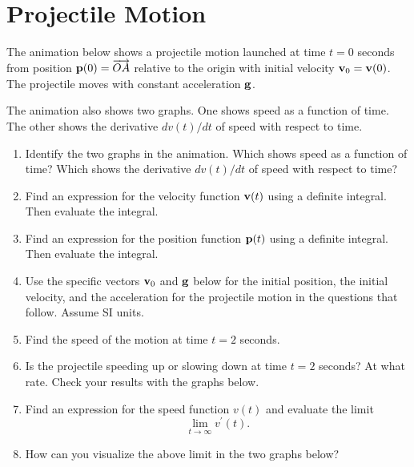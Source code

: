 \documentclass{ximera}
\begin{document}
\section{Projectile Motion}
\begin{question} \label{Q:34re45r45r}
The animation below shows a projectile motion launched at time $t=0$ seconds from position ${\bf p}(0) = \overrightarrow{OA}$ relative to the origin with initial velocity ${\bf v}_0 = {\bf v}(0)$. The projectile moves with constant acceleration ${\bf g}$.

The animation also shows two graphs. One shows speed as a function of time. The other shows the derivative $dv(t)/dt$ of speed with respect to time. 

\begin{enumerate}
\item Identify the two graphs in the animation. Which shows speed as a function of time? Which shows the derivative $dv(t)/dt$ of speed with respect to time?

\item Find an expression for the velocity function ${\bf v}(t)$ using a definite integral. Then evaluate the integral.

\item Find an expression for the position function ${\bf p}(t)$ using a definite integral. Then evaluate the integral.

\item Use the specific vectors ${\bf v}_0$ and ${\bf g}$ below for the initial position, the initial velocity, and the acceleration for the projectile motion in the questions that follow. Assume SI units. 


\item Find the speed of the motion at time $t=2$ seconds.

\item Is the projectile speeding up or slowing down at time $t=2$ seconds? At what rate. Check your results with the graphs below. 

\item Find an expression for the speed function $v(t)$ and evaluate the limit
\[
    \lim_{t\to \infty} v^\prime (t) .
\]

\item How can you visualize the above limit in the two graphs below?


\end{enumerate}
\end{question}
\end{document}
